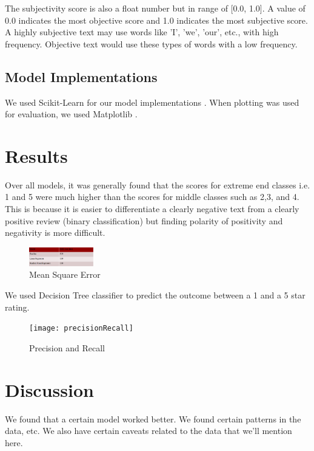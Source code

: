 \documentclass[12pt]{article}
\begin{document}
The subjectivity score is also a float number but in range of [0.0, 1.0]. A value of 0.0
indicates the most objective score and 1.0 indicates the most subjective score. A highly
subjective text may use words like 'I', 'we', 'our', etc., with high frequency. Objective
text would use these types of words with a low frequency.

\subsection{Model Implementations}

We used Scikit-Learn for our model implementations \cite{sklearnl76:online, 32432skl20:online,
  sklearnt25:online}. When plotting was used for evaluation, we used
Matplotlib \cite{Matplotl1:online}. 

\section{Results}

Over all models, it was generally found that the scores for extreme end classes i.e. 1 and 5 
were much higher than the scores for middle classes such as 2,3, and 4. This is because it is 
easier to differentiate a clearly negative text from a clearly positive review (binary classification)
but finding polarity of positivity and negativity is more difficult.

\begin{figure}[h]
  \caption{Mean Square Error}
  \centering
  \includegraphics[width=0.25\textwidth]{imgs/MSE}
  \end{figure}
  
  We used Decision Tree classifier to predict the outcome between a 1 and a 5 star rating.
  
  \begin{figure}[h]
  \caption{Precision and Recall }
  \centering
  \graphicspath{{/Users/shohitbajaj/Documents/imgs}}
  \texttt{[image: precisionRecall]}
  \end{figure}


\section{Discussion}

We found that a certain model worked better. We found certain patterns
in the data, etc. We also have certain caveats related to the data that
we'll mention here.
\end{document}
